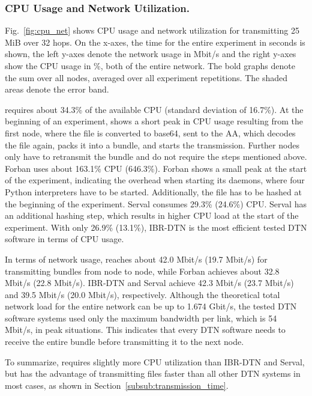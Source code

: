 \subsubsection{CPU Usage and Network Utilization.}


Fig.~\ref{fig:cpu_net} shows CPU usage and network utilization for transmitting 25 MiB over 32 hops.
On the x-axes, the time for the entire experiment in seconds is shown, the left y-axes denote the network usage in Mbit/s and the right y-axes show the CPU usage in \%, both of the entire network.
The bold graphs denote the sum over all nodes, averaged over all experiment repetitions.
The shaded areas denote the error band.

\dtn requires about 34.3\% of the available CPU (standard deviation of 16.7\%).
At the beginning of an experiment, \dtn shows a short peak in CPU usage resulting from the first node, where the file is converted to base64, sent to the \dtn AA, which decodes the file again, packs it into a bundle, and starts the transmission.
Further nodes only have to retransmit the bundle and do not require the steps mentioned above.
Forban uses about 163.1\% CPU (646.3\%).
Forban shows a small peak at the start of the experiment, indicating the overhead when starting its daemons, where four Python interpreters have to be started.
Additionally, the file has to be hashed at the beginning of the experiment.
Serval consumes 29.3\% (24.6\%) CPU.
Serval has an additional hashing step, which results in higher CPU load at the start of the experiment.
With only 26.9\% (13.1\%), IBR-DTN is the most efficient tested DTN software in terms of CPU usage.



In terms of network usage, \dtn reaches about 42.0 Mbit/s (19.7 Mbit/s) for transmitting bundles from node to node, while Forban achieves about 32.8 Mbit/s (22.8 Mbit/s).
IBR-DTN and Serval achieve 42.3 Mbit/s (23.7 Mbit/s) and 39.5 Mbit/s (20.0 Mbit/s), respectively.
Although the theoretical total network load for the entire network can be up to 1.674 Gbit/s, the tested DTN software systems used only the maximum bandwidth per link, which is 54 Mbit/s, in peak situations.
This indicates that every DTN software needs to receive the entire bundle before transmitting it to the next node.


To summarize, \dtn requires slightly more CPU utilization than IBR-DTN and Serval, but has the advantage of transmitting files faster than all other DTN systems in most cases, as shown in Section~\ref{subsub:transmission_time}.

